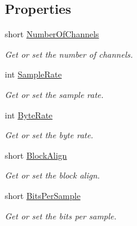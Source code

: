 \subsection*{Properties}
\begin{DoxyCompactItemize}
\item 
short \hyperlink{class_stegosaurus_1_1_carrier_1_1_audio_formats_1_1_audio_file_a038e85d44a449672c16e27c111326af7}{Number\+Of\+Channels}
\begin{DoxyCompactList}\small\item\em Get or set the number of channels. \end{DoxyCompactList}\item 
int \hyperlink{class_stegosaurus_1_1_carrier_1_1_audio_formats_1_1_audio_file_a4d08e828f8189faeb1de0a639a07ac5e}{Sample\+Rate}
\begin{DoxyCompactList}\small\item\em Get or set the sample rate. \end{DoxyCompactList}\item 
int \hyperlink{class_stegosaurus_1_1_carrier_1_1_audio_formats_1_1_audio_file_a4cc1b36f47de282eab3b2798327d70e4}{Byte\+Rate}
\begin{DoxyCompactList}\small\item\em Get or set the byte rate. \end{DoxyCompactList}\item 
short \hyperlink{class_stegosaurus_1_1_carrier_1_1_audio_formats_1_1_audio_file_a99d78d8cf74a9bfccfc5aae75accb7b6}{Block\+Align}
\begin{DoxyCompactList}\small\item\em Get or set the block align. \end{DoxyCompactList}\item 
short \hyperlink{class_stegosaurus_1_1_carrier_1_1_audio_formats_1_1_audio_file_a29d9405c31acf979205938e419b3c337}{Bits\+Per\+Sample}
\begin{DoxyCompactList}\small\item\em Get or set the bits per sample. \end{DoxyCompactList}\end{DoxyCompactItemize}


